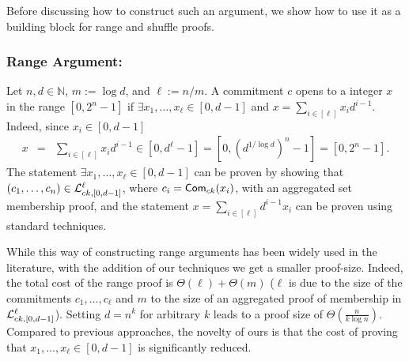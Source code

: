 Before discussing how to construct such an argument, we show how to use it as a building block for range and shuffle proofs.  
\subsubsection{Range Argument:}
Let $n,d\in\mathbb{N}$, $m:=\log d$, and $\ell:=n/m$. A commitment $c$ opens to a integer $x$ in the range $[0,2^n-1]$ if $\exists x_1,\ldots,x_\ell \in[0,d-1]$ and  $x=\sum_{i\in[\ell]}x_id^{i-1}$. Indeed, since $x_i\in[0,d-1]$
\begin{eqnarray*}
x & = & \sum_{i\in[\ell]} x_i d^{i-1}
   \in  [0,d^\ell-1]  =  [0,(d^{1/\log d})^n-1] = [0,2^n-1].
\end{eqnarray*}
The statement $\exists x_1,\ldots,x_\ell \in[0,d-1]$ can be proven by showing that $(c_1,\ldots,c_n)\in\mathcal{L}_{ck,[0,d-1]}^\ell$, where $c_i=\mathsf{Com}_{ck}(x_i)$, with an aggregated set membership proof, and the statement $x=\sum_{i\in[\ell]}d^{i-1}x_i$ can be proven using standard techniques. 

While this way of constructing range arguments has been widely used in the literature, with the addition of our techniques we get a smaller proof-size. Indeed, the total cost of the range proof is $\Theta(\ell)+\Theta(m)$ ($\ell$ is due to the size of the commitments $c_1,\ldots,c_\ell$ and $m$ to the size of an aggregated proof of membership in $\mathcal{L}_{ck,[0,d-1]}^\ell$).  Setting $d=n^{k}$ for arbitrary $k$ leads to a proof size of $\Theta(\frac{n}{k \log n})$. Compared to previous approaches, the novelty of ours is that the cost of proving that $x_1,\ldots,x_\ell\in[0,d-1]$ is significantly reduced.
